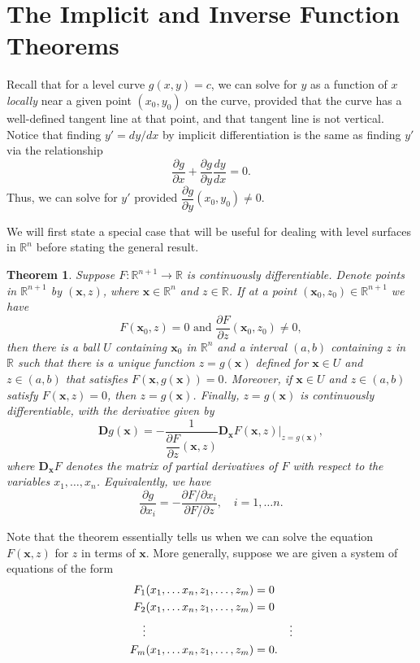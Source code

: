 \documentclass[12pt,letterpaper]{article}
\newtheorem{theorem}{Theorem}[section]
\newcommand{\R}{\mathbb{R}}
\newcommand{\D}{\mathbf{D}}
\newcommand{\x}{\mathbf{x}}
\begin{document}
\section{The Implicit and Inverse Function Theorems}
Recall that for a level curve $g(x,y)=c$, we can solve for $y$ as a function of $x$ {\em locally} near a given point $(x_0,y_0)$ on the curve, provided that the curve has a well-defined tangent line at that point, and that tangent line is not vertical. Notice that finding $y' = dy/dx$ by implicit differentiation is the same as finding $y'$ via the relationship
\[
\frac{\partial g}{\partial x} + \frac{\partial g}{\partial y}\frac{dy}{dx} = 0.
\]
Thus, we can solve for $y'$ provided $\dfrac{\partial g}{\partial y}(x_0,y_0)\neq 0$.

We will first state a special case that will be useful for dealing with level surfaces in $\R^n$ before stating the general result.
\begin{theorem}
Suppose $F:\R^{n+1}\to \R$ is continuously differentiable. Denote points in $\R^{n+1}$ by $(\x,z)$, where $\x\in\R^n$ and $z\in \R$. If at a point $(\x_0,z_0)\in \R^{n+1}$ we have
\[
F(\x_0,z)=0 \text{ and } \frac{\partial F}{\partial z}(\x_0,z_0)\neq 0,
\]
then there is a ball $U$ containing $\x_0$ in $\R^n$ and a interval $(a,b)$ containing $z$ in $\R$ such that there is a unique function $z=g(\x)$ defined for $\x\in U$ and $z\in (a,b)$ that satisfies $F(\x,g(\x))=0$. Moreover, if $\x\in U$ and $z\in (a,b)$ satisfy $F(\x,z)=0$, then $z=g(\x)$. Finally, $z=g(\x)$ is continuously differentiable, with the derivative given by
\[
\D g(\x) = -\frac{1}{\dfrac{\partial F}{\partial z}(\x,z)}\D_\x F(\x,z)|_{z=g(\x)},
\]
where $\D_\x F$ denotes the matrix of partial derivatives of $F$ with respect to the variables $x_1,\ldots, x_n$. Equivalently, we have
\[
\frac{\partial g}{\partial x_i} = -\frac{\partial F/\partial x_i}{\partial F/\partial z},\quad i=1,\ldots n.
\]
\end{theorem}
Note that the theorem essentially tells us when we can solve the equation $F(\x,z)$ for $z$ in terms of $\x$. More generally, suppose we are given a system of equations of the form
\begin{align*}
F_1 &(x_1,\ldots x_n,z_1,\ldots, z_m) = 0\\
F_2 &(x_1,\ldots x_n,z_1,\ldots, z_m) = 0\\
 \vdots &  \hspace{1.75in}\vdots\\
F_m &(x_1,\ldots x_n,z_1,\ldots, z_m) = 0.\\
\end{align*}
\end{document}
